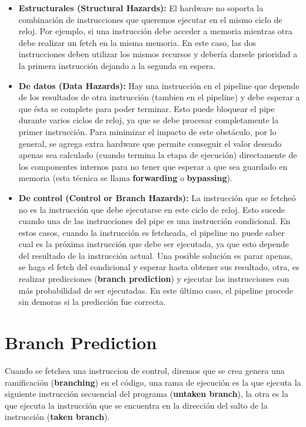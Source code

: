 \begin{itemize}
	\item \textbf{Estructurales (Structural Hazards):} El hardware no soporta la combinación de instrucciones que queremos ejecutar en el mismo ciclo de reloj. Por ejemplo, si una instrucción debe acceder a memoria mientras otra debe realizar un fetch en la misma memoria. En este caso, las dos instrucciones deben utilizar los mismos recursos y debería darsele prioridad a la primera instrucción dejando a la segunda en espera.
	\item \textbf{De datos (Data Hazards):} Hay una instrucción en el pipeline que depende de los resultados de otra instrucción (tambien en el pipeline) y debe esperar a que ésta se complete para poder terminar. Esto puede bloquear el pipe durante varios ciclos de reloj, ya que se debe procesar completamente la primer instrucción. Para minimizar el impacto de este obstáculo, por lo general, se agrega extra hardware que permite conseguir el valor deseado apenas sea calculado (cuando termina la etapa de ejecución) directamente de los componentes internos para no tener que esperar a que sea guardado en memoria (esta técnica se llama \textbf{forwarding} o \textbf{bypassing}).
	\item \textbf{De control (Control or Branch Hazards):} La instrucción que se fetcheó no es la instrucción que debe ejecutarse en este ciclo de reloj. Esto sucede cuando una de las instrucciones del pipe es una instrucción condicional. En estos casos, cuando la instrucción es fetcheada, el pipeline no puede saber cual es la próxima instrucción que debe ser ejecutada, ya que esto depende del resultado de la instrucción actual. Una posible solución es parar apenas, se haga el fetch del condicional y esperar hasta obtener sus resultado, otra, es realizar predicciones (\textbf{branch prediction}) y ejecutar las instrucciones con más probabilidad de ser ejecutadas. En este último caso, el pipeline procede sin demoras si la predicción fue correcta.
\end{itemize}

\newpage
\section{Branch Prediction}\label{sec::branchPrediction}
Cuando se fetchea una instruccion de control, diremos que se crea genera una ramificación (\textbf{branching}) en el código, una rama de ejecución es la que ejecuta la siguiente instrucción secuencial del programa (\textbf{untaken branch}), la otra es la que ejecuta la instrucción que se encuentra en la dirección del salto de la instrucción (\textbf{taken branch}).

